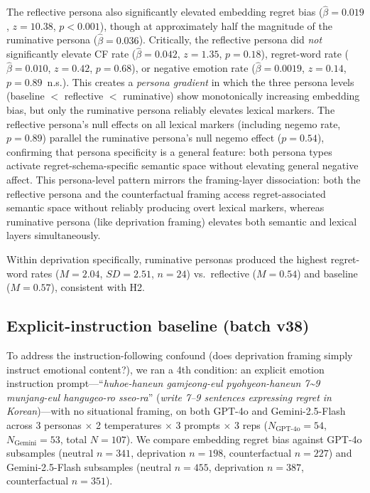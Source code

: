 \documentclass[conference,10pt]{IEEEtran}
\begin{document}
The reflective persona also significantly elevated embedding regret bias ($\hat{\beta}=0.019$, $z=10.38$, $p<0.001$), though at approximately half the magnitude of the ruminative persona ($\hat{\beta}=0.036$). Critically, the reflective persona did \emph{not} significantly elevate CF rate ($\hat{\beta}=0.042$, $z=1.35$, $p=0.18$), regret-word rate ($\hat{\beta}=0.010$, $z=0.42$, $p=0.68$), or negative emotion rate ($\hat{\beta}=0.0019$, $z=0.14$, $p=0.89$~n.s.). This creates a \emph{persona gradient} in which the three persona levels (baseline $<$ reflective $<$ ruminative) show monotonically increasing embedding bias, but only the ruminative persona reliably elevates lexical markers. The reflective persona's null effects on all lexical markers (including negemo rate, $p=0.89$) parallel the ruminative persona's null negemo effect ($p=0.54$), confirming that persona specificity is a general feature: both persona types activate regret-schema-specific semantic space without elevating general negative affect. This persona-level pattern mirrors the framing-layer dissociation: both the reflective persona and the counterfactual framing access regret-associated semantic space without reliably producing overt lexical markers, whereas ruminative persona (like deprivation framing) elevates both semantic and lexical layers simultaneously.

Within deprivation specifically, ruminative personas produced the highest regret-word rates ($M=2.04$, $SD=2.51$, $n=24$) vs.\ reflective ($M=0.54$) and baseline ($M=0.57$), consistent with H2.

\subsection{Explicit-instruction baseline (batch v38)}\label{sec:ei_baseline}

To address the instruction-following confound (does deprivation framing simply instruct emotional content?), we ran a 4th condition: an explicit emotion instruction prompt---``\textit{huhoe-haneun gamjeong-eul pyohyeon-haneun 7\textasciitilde{}9 munjang-eul hangugeo-ro sseo-ra}'' (\textit{write 7--9 sentences expressing regret in Korean})---with no situational framing, on both GPT-4o and Gemini-2.5-Flash across 3 personas $\times$ 2 temperatures $\times$ 3 prompts $\times$ 3 reps ($N_\text{GPT-4o}=54$, $N_\text{Gemini}=53$, total $N=107$). We compare embedding regret bias against GPT-4o subsamples (neutral $n=341$, deprivation $n=198$, counterfactual $n=227$) and Gemini-2.5-Flash subsamples (neutral $n=455$, deprivation $n=387$, counterfactual $n=351$).
\end{document}
